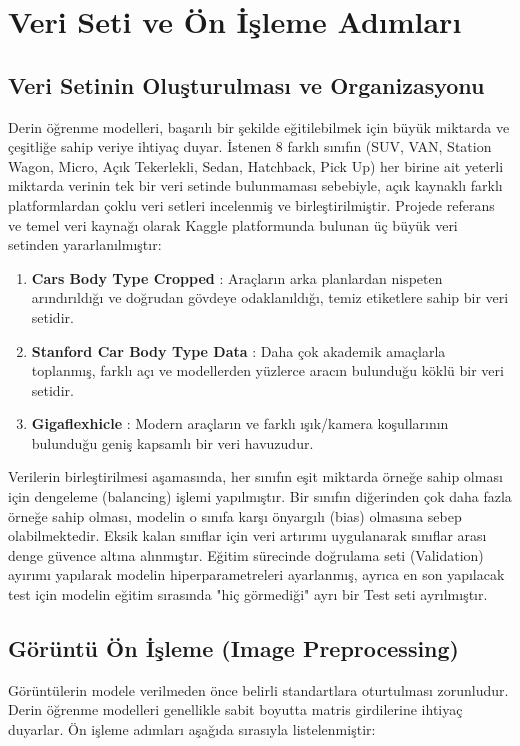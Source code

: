 \documentclass[conference]{IEEEtran}
\begin{document}
\section{Veri Seti ve Ön İşleme Adımları}

\subsection{Veri Setinin Oluşturulması ve Organizasyonu}
Derin öğrenme modelleri, başarılı bir şekilde eğitilebilmek için büyük miktarda ve çeşitliğe sahip veriye ihtiyaç duyar. İstenen 8 farklı sınıfın (SUV, VAN, Station Wagon, Micro, Açık Tekerlekli, Sedan, Hatchback, Pick Up) her birine ait yeterli miktarda verinin tek bir veri setinde bulunmaması sebebiyle, açık kaynaklı farklı platformlardan çoklu veri setleri incelenmiş ve birleştirilmiştir. Projede referans ve temel veri kaynağı olarak Kaggle platformunda bulunan üç büyük veri setinden yararlanılmıştır:
\begin{enumerate}
    \item \textbf{Cars Body Type Cropped} \cite{ref_dataset1}: Araçların arka planlardan nispeten arındırıldığı ve doğrudan gövdeye odaklanıldığı, temiz etiketlere sahip bir veri setidir.
    \item \textbf{Stanford Car Body Type Data} \cite{ref_dataset2}: Daha çok akademik amaçlarla toplanmış, farklı açı ve modellerden yüzlerce aracın bulunduğu köklü bir veri setidir.
    \item \textbf{Gigaflexhicle} \cite{ref_dataset3}: Modern araçların ve farklı ışık/kamera koşullarının bulunduğu geniş kapsamlı bir veri havuzudur.
\end{enumerate}

Verilerin birleştirilmesi aşamasında, her sınıfın eşit miktarda örneğe sahip olması için dengeleme (balancing) işlemi yapılmıştır. Bir sınıfın diğerinden çok daha fazla örneğe sahip olması, modelin o sınıfa karşı önyargılı (bias) olmasına sebep olabilmektedir. Eksik kalan sınıflar için veri artırımı uygulanarak sınıflar arası denge güvence altına alınmıştır. Eğitim sürecinde doğrulama seti (Validation) ayırımı yapılarak modelin hiperparametreleri ayarlanmış, ayrıca en son yapılacak test için modelin eğitim sırasında "hiç görmediği" ayrı bir Test seti ayrılmıştır.

\subsection{Görüntü Ön İşleme (Image Preprocessing)}
Görüntülerin modele verilmeden önce belirli standartlara oturtulması zorunludur. Derin öğrenme modelleri genellikle sabit boyutta matris girdilerine ihtiyaç duyarlar.
Ön işleme adımları aşağıda sırasıyla listelenmiştir:
\end{document}
